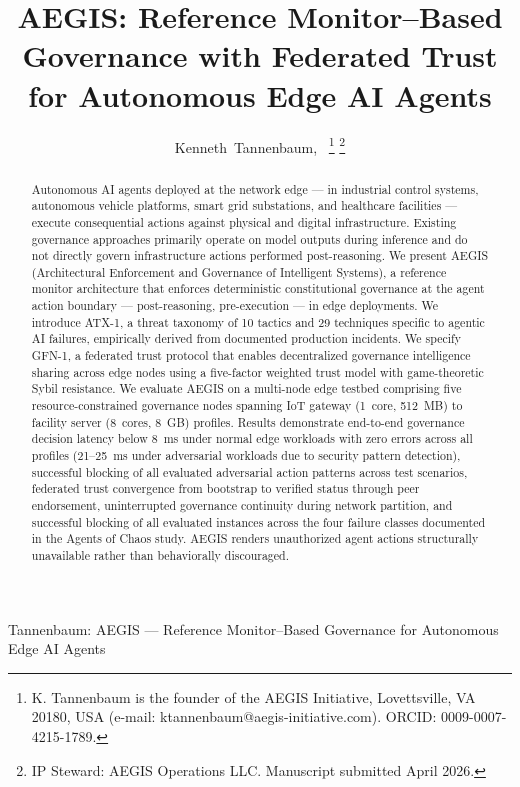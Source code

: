 \documentclass[journal]{IEEEtran}
\begin{document}
\title{AEGIS: Reference Monitor--Based Governance with Federated Trust for Autonomous Edge AI Agents}

\author{Kenneth~Tannenbaum,~
\thanks{K. Tannenbaum is the founder of the AEGIS Initiative, Lovettsville, VA 20180, USA (e-mail: ktannenbaum@aegis-initiative.com). ORCID: 0009-0007-4215-1789.}
\thanks{IP Steward: AEGIS Operations LLC. Manuscript submitted April 2026.}}

%
{Tannenbaum: AEGIS --- Reference Monitor--Based Governance for Autonomous Edge AI Agents}

\maketitle

\begin{abstract}
Autonomous AI agents deployed at the network edge --- in industrial control systems, autonomous vehicle platforms, smart grid substations, and healthcare facilities --- execute consequential actions against physical and digital infrastructure. Existing governance approaches primarily operate on model outputs during inference and do not directly govern infrastructure actions performed post-reasoning. We present AEGIS (Architectural Enforcement and Governance of Intelligent Systems), a reference monitor architecture that enforces deterministic constitutional governance at the agent action boundary --- post-reasoning, pre-execution --- in edge deployments. We introduce ATX-1, a threat taxonomy of 10 tactics and 29 techniques specific to agentic AI failures, empirically derived from documented production incidents. We specify GFN-1, a federated trust protocol that enables decentralized governance intelligence sharing across edge nodes using a five-factor weighted trust model with game-theoretic Sybil resistance. We evaluate AEGIS on a multi-node edge testbed comprising five resource-constrained governance nodes spanning IoT gateway (1~core, 512~MB) to facility server (8~cores, 8~GB) profiles. Results demonstrate end-to-end governance decision latency below 8~ms under normal edge workloads with zero errors across all profiles (21--25~ms under adversarial workloads due to security pattern detection), successful blocking of all evaluated adversarial action patterns across test scenarios, federated trust convergence from bootstrap to verified status through peer endorsement, uninterrupted governance continuity during network partition, and successful blocking of all evaluated instances across the four failure classes documented in the Agents of Chaos study. AEGIS renders unauthorized agent actions structurally unavailable rather than behaviorally discouraged.
\end{abstract}
\end{document}

